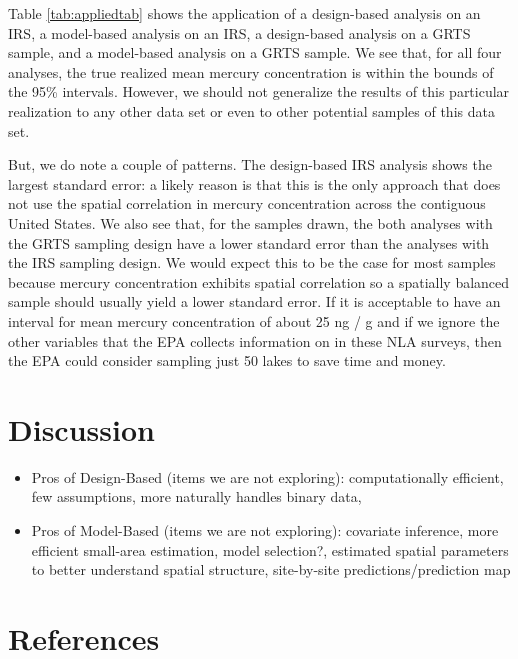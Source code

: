 \documentclass[]{elsarticle} %
\begin{document}
Table \ref{tab:appliedtab} shows the application of a design-based
analysis on an IRS, a model-based analysis on an IRS, a design-based
analysis on a GRTS sample, and a model-based analysis on a GRTS sample.
We see that, for all four analyses, the true realized mean mercury
concentration is within the bounds of the 95\% intervals. However, we
should not generalize the results of this particular realization to any
other data set or even to other potential samples of this data set.

\pagebreak

But, we do note a couple of patterns. The design-based IRS analysis
shows the largest standard error: a likely reason is that this is the
only approach that does not use the spatial correlation in mercury
concentration across the contiguous United States. We also see that, for
the samples drawn, the both analyses with the GRTS sampling design have
a lower standard error than the analyses with the IRS sampling design.
We would expect this to be the case for most samples because mercury
concentration exhibits spatial correlation so a spatially balanced
sample should usually yield a lower standard error. If it is acceptable
to have an interval for mean mercury concentration of about 25 ng / g
and if we ignore the other variables that the EPA collects information
on in these NLA surveys, then the EPA could consider sampling just 50
lakes to save time and money.

\hypertarget{sec:discussion}{%
\section{Discussion}\label{sec:discussion}}

\begin{itemize}
\item
  Pros of Design-Based (items we are not exploring): computationally
  efficient, few assumptions, more naturally handles binary data,
\item
  Pros of Model-Based (items we are not exploring): covariate inference,
  more efficient small-area estimation, model selection?, estimated
  spatial parameters to better understand spatial structure,
  site-by-site predictions/prediction map
\end{itemize}

\hypertarget{references}{%
\section*{References}\label{references}}
\end{document}
